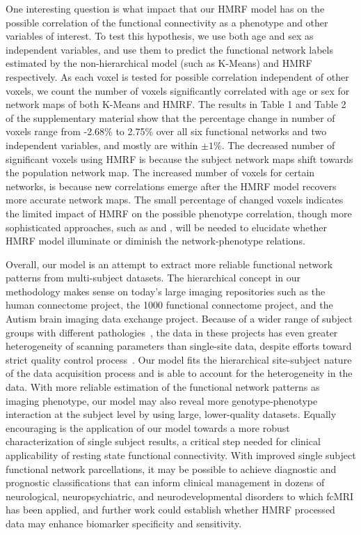\documentclass[review,authoryear]{elsarticle}
\begin{document}
One interesting question is what impact that our HMRF model has on the possible
correlation of the functional connectivity as a phenotype and other variables of
interest. To test this hypothesis, we use both age and sex as independent
variables, and use them to predict the functional network labels estimated by
the non-hierarchical model (such as K-Means) and HMRF respectively. As each
voxel is tested for possible correlation independent of other voxels, we count
the number of voxels significantly correlated with age or sex for network maps
of both K-Means and HMRF. The results in Table 1 and Table 2 of the
supplementary material show that the percentage change in number of voxels
range from -2.68\% to 2.75\% over all six functional networks and two
independent variables, and mostly are within $\pm 1\%$. The decreased number of
significant voxels using HMRF is because the subject network maps shift towards
the population network map. The increased number of voxels for certain networks,
is because new correlations emerge after the HMRF model recovers more
accurate network maps. The small percentage of changed voxels indicates
the limited impact of HMRF on the possible phenotype correlation, though more
sophisticated approaches, such as \citet{alexander2012discovery}
 and \citet{reiss2012paradoxical}, will be needed to elucidate whether HMRF model
illuminate or diminish the network-phenotype relations. 

Overall, our model is an attempt to extract more reliable functional network
patterns from multi-subject datasets. The hierarchical concept in our
methodology makes sense on today's large imaging repositories such as the human
connectome project, the 1000 functional connectome project, and the Autism brain
imaging data exchange project. Because of a wider range of subject groups with
different pathologies~\citep{smith2012future}, the data in these projects has
even greater heterogeneity of scanning parameters than single-site data, despite
efforts toward strict quality control process~\citep{marcus2013human}. Our model
fits the hierarchical site-subject nature of the data acquisition process and is
able to account for the heterogeneity in the data. With more reliable estimation
of the functional network patterns as imaging phenotype, our model may also
reveal more genotype-phenotype interaction at the subject level by using large,
lower-quality datasets. Equally encouraging is the application of our model
towards a more robust characterization of single subject results, a critical
step needed for clinical applicability of resting state functional
connectivity. With improved single subject functional network parcellations, it
may be possible to achieve diagnostic and prognostic classifications that can
inform clinical management in dozens of neurological, neuropsychiatric, and
neurodevelopmental disorders to which fcMRI has been applied, and further work
could establish whether HMRF processed data may enhance biomarker specificity
and sensitivity.
\end{document}

